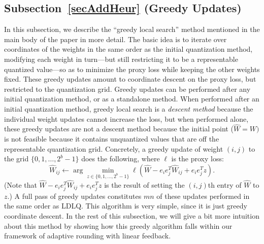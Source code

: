 \subsection{Subsection~\ref{secAddHeur} (Greedy Updates)}

In this subsection, we describe the ``greedy local search'' method mentioned in the main body of the paper in more detail.
The basic idea is to iterate over coordinates of the weights in the same order as the initial quantization method, modifying each weight in turn---but still restricting it to be a representable quantized value---so as to minimize the proxy loss while keeping the other weights fixed.
These greedy updates amount to coordinate descent on the proxy loss, but restricted to the quantization grid.
Greedy updates can be performed after any initial quantization method, or as a standalone method.
When performed after an initial quantization method, greedy local search is a \emph{descent method} because the individual weight updates cannot increase the loss, but when performed alone, these greedy updates are not a descent method because the initial point ($\hat W = W)$ is not feasible because it contains unquantized values that are off the representable quantization grid.
Concretely, a greedy update of weight $(i,j)$ to the grid $\{0,1,\ldots,2^b - 1\}$ does the following, where $\ell$ is the proxy loss:
\[
    \hat W_{ij} \gets \arg \min_{z \in \{0,1,\ldots,2^b - 1\}} \ell(\hat W - e_i e_j^T \hat W_{ij} + e_i e_j^T z).
\]
(Note that $\hat W - e_i e_j^T \hat W_{ij} + e_i e_j^T z$ is the result of setting the $(i,j)$th entry of $\hat W$ to $z$.)
A full pass of greedy updates constitutes $mn$ of these updates performed in the same order as LDLQ.
This algorithm is very simple, since it is just greedy coordinate descent. In the rest of this subsection, we will give a bit more intuition about this method by showing how this greedy algorithm falls within our framework of adaptive rounding with linear feedback.

